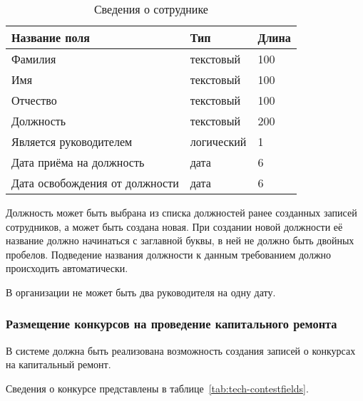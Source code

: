 \begin{footnotesize}
\begin{longtable}[h]{|p{}|p{}|p{}|}
	\caption{\label{tab:tech-employeefields}Сведения о сотруднике} \\
	\hline
		\textbf{Название поля} & \textbf{Тип} & \textbf{Длина} \\
	\hline \endhead
		Фамилия & текстовый & 100 \\
	\hline
		Имя & текстовый & 100 \\
	\hline
		Отчество & текстовый & 100 \\
	\hline
		Должность & текстовый & 200 \\
	\hline
		Является руководителем & логический & 1 \\
	\hline
		Дата приёма на должность & дата & 6 \\
	\hline
		Дата освобождения от должности & дата & 6 \\
	\hline
\end{longtable}
\end{footnotesize}

Должность может быть выбрана из списка должностей ранее созданных записей сотрудников, а может быть создана новая.
При создании новой должности её название должно начинаться с заглавной буквы, в ней не должно быть двойных пробелов.
Подведение названия должности к данным требованием должно происходить автоматически.

В организации не может быть два руководителя на одну дату.

\subsubsection{Размещение конкурсов на проведение капитального ремонта}

В системе должна быть реализована возможность создания записей о конкурсах на капитальный ремонт.

Сведения о конкурсе представлены в таблице~\ref{tab:tech-contestfields}.

